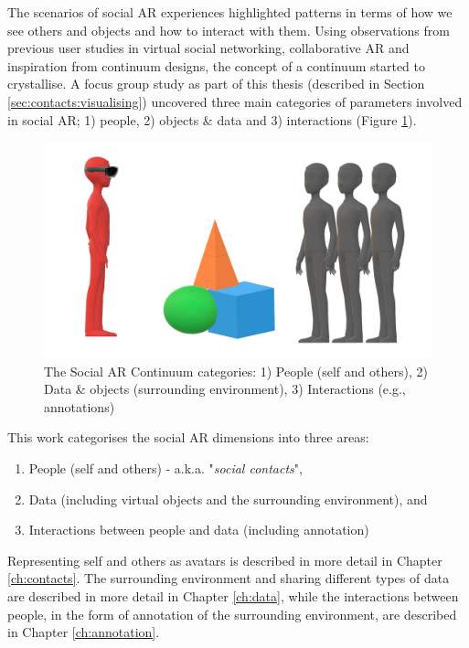 The scenarios of social AR experiences highlighted patterns in terms of how we see others and objects and how to interact with them. Using observations from previous user studies in virtual social networking, collaborative AR and inspiration from continuum designs, the concept of a continuum started to crystallise. A focus group study as part of this thesis (described in Section \ref{sec:contacts:visualising}) uncovered three main categories of parameters involved in social AR; 1) people, 2) objects \& data and 3) interactions (Figure \ref{fig:continuum:categories}).

\begin{figure}[ht]
    \centering
    \includegraphics[width=0.8\linewidth]{images/30-continuum/continuum_categories5.png}
    \caption{The Social AR Continuum categories: 1) People (self and others), 2) Data \& objects (surrounding environment), 3) Interactions (e.g., annotations)}
    \label{fig:continuum:categories}
\end{figure}

This work categorises the social AR dimensions into three areas: 
\begin{enumerate}
    \item People (self and others) - a.k.a. "\textit{social contacts}",
    \item Data (including virtual objects and the surrounding environment), and
    \item Interactions between people and data (including annotation)
\end{enumerate}

Representing self and others as avatars is described in more detail in Chapter \ref{ch:contacts}. The surrounding environment and sharing different types of data are described in more detail in Chapter \ref{ch:data}, while the interactions between people, in the form of annotation of the surrounding environment, are described in Chapter \ref{ch:annotation}.

